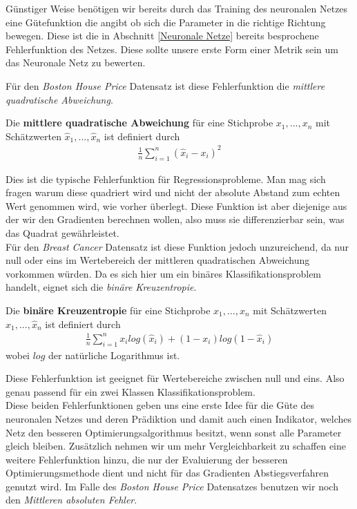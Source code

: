 Günstiger Weise benötigen wir bereits durch das Training des neuronalen Netzes 
eine Gütefunktion die angibt ob sich die Parameter in die richtige Richtung bewegen.
Diese ist die in Abschnitt \ref{Neuronale Netze} bereits besprochene Fehlerfunktion des 
Netzes. Diese sollte unsere erste Form einer Metrik sein um das Neuronale Netz zu bewerten.

Für den \textit{Boston House Price} Datensatz ist diese Fehlerfunktion die
\textit{mittlere quadratische Abweichung}.

\begin{definition}
    \cite[S.344]{Fahrmeir.2016} Die \textbf{mittlere quadratische Abweichung} für eine Stichprobe $x_1,...,x_n$
    mit Schätzwerten $\hat{x}_1,...,\hat{x}_n$ ist definiert durch
    \begin{align}
        \frac{1}{n}\sum\limits_{i=1}^{n} (\hat{x}_i-x_i)^2
    \end{align}
\end{definition}

Dies ist die typische Fehlerfunktion für Regressionsprobleme. Man mag sich fragen
warum diese quadriert wird und nicht der absolute Abstand zum echten Wert genommen
wird, wie vorher überlegt. Diese Funktion ist aber diejenige aus der wir den Gradienten
berechnen wollen, also muss sie differenzierbar sein, was das Quadrat gewährleistet.\\

Für den \textit{Breast Cancer} Datensatz ist diese Funktion jedoch unzureichend, da 
nur null oder eins im Wertebereich der mittleren quadratischen Abweichung vorkommen würden.
Da es sich hier um ein binäres Klassifikationsproblem handelt, eignet sich die \textit{binäre Kreuzentropie}.

\begin{definition}
    \cite{Rubinstein.2004} Die \textbf{binäre Kreuzentropie} für eine Stichprobe $x_1,...,x_n$
    mit Schätzwerten $\hat{x}_1,...,\hat{x}_n$ ist definiert durch
    \begin{align}
        \frac{1}{n}\sum\limits_{i=1}^{n} x_i log(\hat{x}_i) + (1-x_i)log(1-\hat{x}_i)
    \end{align}
    wobei $log$ der natürliche Logarithmus ist.
\end{definition}

Diese Fehlerfunktion ist geeignet für Wertebereiche zwischen null und eins. Also genau 
passend für ein zwei Klassen Klassifikationsproblem. \\

Diese beiden Fehlerfunktionen geben uns eine erste Idee für die Güte des neuronalen 
Netzes und deren Prädiktion und damit auch einen Indikator, welches
Netz den besseren Optimierungsalgorithmus besitzt, wenn sonst alle Parameter 
gleich bleiben. 
Zusätzlich nehmen wir um mehr Vergleichbarkeit zu schaffen eine weitere Fehlerfunktion hinzu,
die nur der Evaluierung der besseren Optimierungsmethode dient und nicht 
für das Gradienten Abstiegsverfahren genutzt wird.
Im Falle des \textit{Boston House Price} Datensatzes benutzen wir noch den 
\textit{Mittleren absoluten Fehler}.

